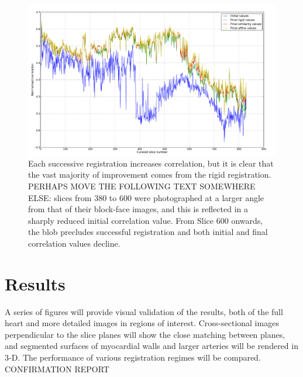       \begin{figure}
        \centering
        \includegraphics[width=\textheight]{Ch6/Figs/diagnostics/initial_and_final_values_comparison}
        \caption{Each successive registration increases correlation, but it is clear that the vast majority of improvement comes from the rigid registration. PERHAPS MOVE THE FOLLOWING TEXT SOMEWHERE ELSE: slices from 380 to 600 were photographed at a larger angle from that of their block-face images, and this is reflected in a sharply reduced initial correlation value. From Slice 600 onwards, the blob precludes successful registration and both initial and final correlation values decline.}
        \label{fig:initial_and_final_values_comparison}
      \end{figure}
      
   
\section{Results}
  A series of figures will provide visual validation of the results, both of the full heart and more detailed images in regions of interest. Cross-sectional images perpendicular to the slice planes will show the close matching between planes, and segmented surfaces of myocardial walls and larger arteries will be rendered in 3-D. The performance of various registration regimes will be compared.
CONFIRMATION REPORT


